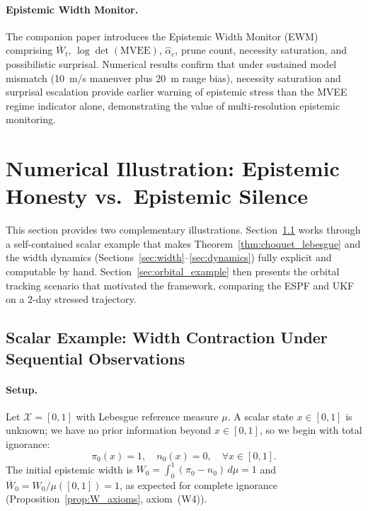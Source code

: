 \documentclass[12pt]{article}
\newcommand{\calX}{\mathcal{X}}
\begin{document}
\paragraph{Epistemic Width Monitor.}
The companion paper \cite{jah2026optimality} introduces the Epistemic Width Monitor
(EWM) comprising $\overline{W}_t$, $\log\det(\mathrm{MVEE})$, $\hat{\alpha}_c$,
prune count, necessity saturation, and possibilistic surprisal.
Numerical results confirm that under sustained model mismatch (10~m/s maneuver
plus 20~m range bias), necessity saturation and surprisal escalation provide
earlier warning of epistemic stress than the MVEE regime indicator alone,
demonstrating the value of multi-resolution epistemic monitoring.

\section{Numerical Illustration: Epistemic Honesty vs.\ Epistemic Silence}
\label{sec:numerical}

This section provides two complementary illustrations.
Section~\ref{sec:scalar_example} works through a self-contained scalar example
that makes Theorem~\ref{thm:choquet_lebesgue} and the width dynamics
(Sections~\ref{sec:width}--\ref{sec:dynamics}) fully explicit and
computable by hand.
Section~\ref{sec:orbital_example} then presents the orbital tracking scenario
that motivated the framework, comparing the ESPF and UKF on a 2-day stressed
trajectory.

\subsection{Scalar Example: Width Contraction Under Sequential Observations}
\label{sec:scalar_example}

\paragraph{Setup.}
Let $\calX = [0,1]$ with Lebesgue reference measure $\mu$.
A scalar state $x\in[0,1]$ is unknown; we have no prior information
beyond $x\in[0,1]$, so we begin with total ignorance:
\begin{equation}
\pi_0(x) = 1, \quad n_0(x) = 0, \quad \forall x\in[0,1].
\label{eq:scalar_pi0}
\end{equation}
The initial epistemic width is $W_0 = \int_0^1 (\pi_0 - n_0)\,d\mu = 1$ and
$\overline{W}_0 = W_0/\mu([0,1]) = 1$, as expected for complete ignorance
(Proposition~\ref{prop:W_axioms}, axiom~(W4)).
\end{document}
